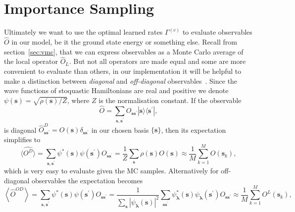 \section{Importance Sampling}
\label{sec:Impl-MCIP}
Ultimately we want to use the optimal learned rates $\Gamma^{(v)}$ to evaluate observables $\hat O$ in our model, be it the ground state energy or something else. Recall from section~\ref{sec:vmc}, that we can express observables as a Monte Carlo average of the local operator $\hat O_L$. But not all operators are made equal and some are more convenient to evaluate than others, in our implementation it will be helpful to make a distinction between \emph{diagonal} and \emph{off-diagonal} observables~\cite{torlai2018neural}. Since the wave functions of stoquastic Hamiltonians are real and positive we denote $\psi(\boldsymbol{s}) = \sqrt{\rho(\boldsymbol{s})/Z}$, where $Z$ is the normalisation constant. If the observable
\begin{equation}
	\hat {O}=\sum_{\boldsymbol{s}, \boldsymbol{s}^{\prime}} {O}_{\boldsymbol{s} \boldsymbol{s}^{\prime}}|\boldsymbol{s}\rangle \langle \boldsymbol{s}^{\prime}|,
\end{equation}
is diagonal $\hat{O}_{\boldsymbol{s} \boldsymbol{s}^{\prime}}^{D}={O}(\boldsymbol{s}) \delta_{\boldsymbol{s} \boldsymbol{s}^{\prime}}$ in our chosen basis $\{\boldsymbol{s}\}$, then its expectation simplifies to 
\begin{equation}
	\langle\hat{O^D}\rangle=\sum_{\boldsymbol{s}, \boldsymbol{s}^{\prime}} \psi^*(\boldsymbol{s}) \psi(\boldsymbol{s}^{\prime}) {O}_{\boldsymbol{s} \boldsymbol{s}^{\prime}} = \frac{1}{Z} \sum_{\boldsymbol{s}} \rho(\boldsymbol{s}) O({\boldsymbol{s}})  \approx \frac{1}{M} \sum_{k=1}^{M} O(\boldsymbol{s}_{k}),
\end{equation}
which is very easy to evaluate given the MC samples. Alternatively for off-diagonal observables the expectation becomes
\begin{equation}
	\left\langle\hat{O}^{OD}\right\rangle=\sum_{\boldsymbol{s}, \boldsymbol{s}^{\prime}} \psi^{*}(\boldsymbol{s}) \psi(\boldsymbol{s}^{\prime}) O_{\boldsymbol{s} \boldsymbol{s}^{\prime}} = \frac{1}{\sum_{\boldsymbol{s}}\left|\psi_{\boldsymbol{\lambda}}(\boldsymbol{s})\right|^{2}} \sum_{\boldsymbol{s} \boldsymbol{s}^{\prime}} \psi_{\boldsymbol{\lambda}}^{*}(\boldsymbol{s}) \psi_{\boldsymbol{\lambda}}(\boldsymbol{s}^{\prime}) O_{\boldsymbol{s} \boldsymbol{s}^{\prime}} \approx \frac{1}{M} \sum_{k=1}^{M} O^L(\boldsymbol{s}_{k}),
\end{equation}
